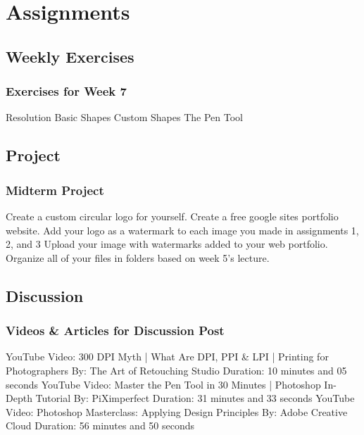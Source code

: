 \documentclass{beamer}
\begin{document}
		\section{Assignments}
			\subsection{Weekly Exercises}		
			\begin{frame}
				\frametitle{Exercises for Week 7}
				\begin{outline}
					\1 Resolution
					\1 Basic Shapes
					\1 Custom Shapes
					\1 The Pen Tool
				\end{outline}
			\end{frame}
		
		\subsection{Project}		
			\begin{frame}
				\frametitle{Midterm Project}
				\begin{outline}
					\1 Create a custom circular logo for yourself.
					\1 Create a free google sites portfolio website.  
					\1 Add your logo as a watermark to each image you made in assignments 1,  2, and 3
					\1 Upload your image with watermarks added to your web portfolio.  
					\1 Organize all of your files in folders based on week 5's lecture.
				\end{outline}
			\end{frame}
	
			\subsection{Discussion}		
				\begin{frame}
					\frametitle{Videos \& Articles for Discussion Post}
					\begin{outline}
						\1 YouTube Video:  300 DPI Myth | What Are DPI, PPI \& LPI | Printing for Photographers
							\2 By:          The Art of Retouching Studio
							\2 Duration:     10 minutes and 05 seconds
						\1 YouTube Video:  Master the Pen Tool in 30 Minutes | Photoshop In-Depth Tutorial
							\2 By:          PiXimperfect
							\2 Duration:  31 minutes and 33 seconds
						\1 YouTube Video:  Photoshop Masterclass: Applying Design Principles
							\2 By:          Adobe Creative Cloud
							\2 Duration:     56 minutes and 50 seconds
					\end{outline}
					
				\end{frame}
\end{document}
